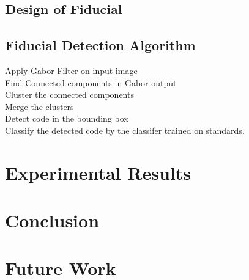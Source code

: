 \documentclass[runningheads]{llncs}
\begin{document}
\subsection{Design of Fiducial}

\subsection{Fiducial Detection Algorithm}
Apply Gabor Filter on input image \\
Find Connected components in Gabor output \\
Cluster the connected components \\
Merge the clusters \\
Detect code in the bounding box \\
Classify the detected code by the classifer trained on standards. 

\section{Experimental Results}

\section{Conclusion}

\section{Future Work}



\end{document}
